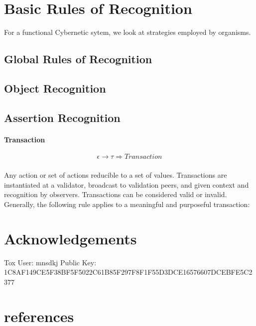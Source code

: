 \documentclass{article}
\begin{document}
	
\section{Basic Rules of Recognition}
For a functional Cybernetic sytem, we look at strategies employed by organisms.

\subsection{Global Rules of Recognition}

\subsection{Object Recognition}

\subsection{Assertion Recognition}
	
		\paragraph{Transaction}
		\begin{equation}
		\epsilon \rightarrow \tau \Rightarrow Transaction
		\end{equation}
		\subparagraph{}
			Any action or set of actions reducible to a set of values.  Transactions are instantiated at a validator, broadcast to validation peers, and given context and recognition by observers.  Transactions can be considered valid or invalid. Generally, the following rule applies to a meaningful and purposeful transaction:

\section{Acknowledgements}
	Tox User: mnsdkj  
	Public Key: 1C8AF149CE5F38BF5F5022C61B85F297F8F1F55D3DCE16576607DCEBFE5C2377

\section{references}




\newpage
	
\end{document}
